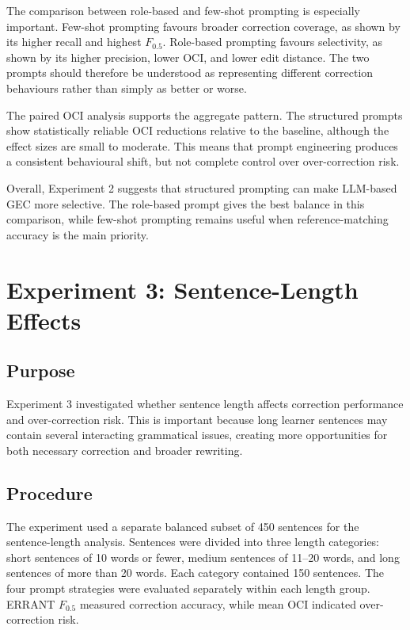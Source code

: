 The comparison between role-based and few-shot prompting is especially important. Few-shot prompting favours broader correction coverage, as shown by its higher recall and highest $F_{0.5}$. Role-based prompting favours selectivity, as shown by its higher precision, lower OCI, and lower edit distance. The two prompts should therefore be understood as representing different correction behaviours rather than simply as better or worse.

The paired OCI analysis supports the aggregate pattern. The structured prompts show statistically reliable OCI reductions relative to the baseline, although the effect sizes are small to moderate. This means that prompt engineering produces a consistent behavioural shift, but not complete control over over-correction risk.

Overall, Experiment 2 suggests that structured prompting can make LLM-based GEC more selective. The role-based prompt gives the best balance in this comparison, while few-shot prompting remains useful when reference-matching accuracy is the main priority.

\section{Experiment 3: Sentence-Length Effects}

\subsection{Purpose}

Experiment 3 investigated whether sentence length affects correction performance and over-correction risk. This is important because long learner sentences may contain several interacting grammatical issues, creating more opportunities for both necessary correction and broader rewriting.

\subsection{Procedure}

The experiment used a separate balanced subset of 450 sentences for the sentence-length analysis. Sentences were divided into three length categories: short sentences of 10 words or fewer, medium sentences of 11--20 words, and long sentences of more than 20 words. Each category contained 150 sentences. The four prompt strategies were evaluated separately within each length group. ERRANT $F_{0.5}$ measured correction accuracy, while mean OCI indicated over-correction risk.

